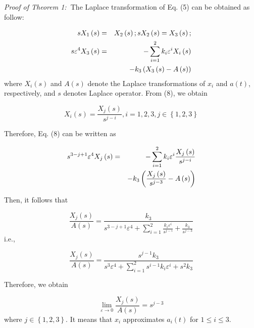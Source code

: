 \documentclass[10pt,journal]{IEEEtran}
\begin{document}
\emph{Proof of Theorem 1:}\textbf{\ }The Laplace transformation of Eq. (5)
can be obtained as follow:

\begin{eqnarray}
sX_{1}\left( s\right) &=&X_{2}\left( s\right) ;sX_{2}\left( s\right)
=X_{3}\left( s\right) ;  \notag \\
s\varepsilon ^{4}X_{3}\left( s\right) &=&-\sum\limits_{{i=1}}^{{2}}k_{i}\varepsilon ^{i}X_{i}\left( s\right)  \notag \\
&&-k_{3}\left( X_{3}\left( s\right) -A\left( s\right) \right)
\end{eqnarray}where $X_{i}\left( s\right) $ and $A\left( s\right) $ denote the Laplace
transformations of $x_{i}$ and $a\left( t\right) $, respectively, and $s$
denotes Laplace operator. From (8), we obtain

\begin{equation}
X_{i}\left( s\right) =\frac{X_{j}\left( s\right) }{s^{j-i}},i=1,2,3,j\in
\left\{ 1,2,3\right\}
\end{equation}

Therefore, Eq. (8) can be written as

\begin{eqnarray}
s^{3-j+1}\varepsilon ^{4}X_{j}\left( s\right) &=&-\sum\limits_{{i=1}}^{{2}}k_{i}\varepsilon ^{i}\frac{X_{j}\left( s\right) }{s^{j-i}}  \notag \\
&&-k_{3}\left( \frac{X_{j}\left( s\right) }{s^{j-3}}-A\left( s\right) \right)
\end{eqnarray}

Then, it follows that

\begin{equation}
\frac{X_{j}\left( s\right) }{A\left( s\right) }=\frac{k_{3}}{s^{3-j+1}\varepsilon ^{4}+\sum\limits_{{i=1}}^{{2}}\frac{k_{i}\varepsilon
^{i}}{s^{j-i}}+\frac{k_{3}}{s^{j-3}}}
\end{equation}i.e.,

\begin{equation}
\frac{X_{j}\left( s\right) }{A\left( s\right) }=\frac{s^{j-1}k_{3}}{s^{3}\varepsilon ^{4}+\sum\limits_{{i=1}}^{{2}}s^{i-1}k_{i}\varepsilon
^{i}+s^{2}k_{3}}
\end{equation}

Therefore, we obtain

\begin{equation}
\underset{\varepsilon \rightarrow 0}{\lim }\frac{X_{j}\left( s\right) }{A\left( s\right) }=s^{j-3}
\end{equation}where $j\in \left\{ 1,2,3\right\} $. It means that $x_{i}$ approximates $a_{i}\left( t\right) $ for $1\leq i\leq 3$.
\end{document}
